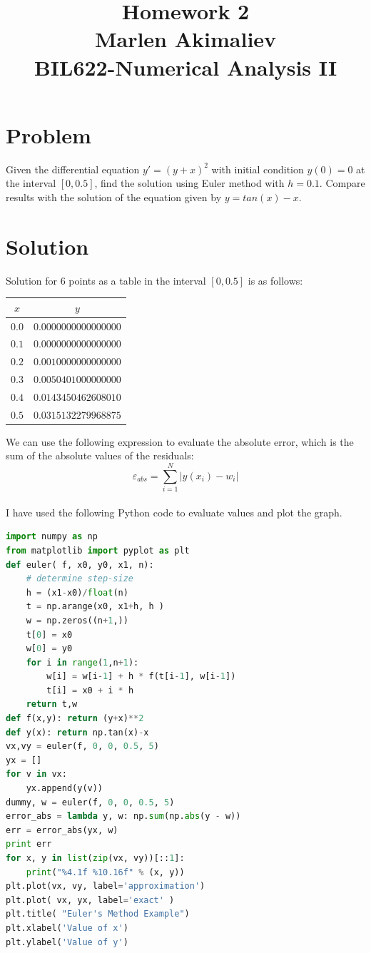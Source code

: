 \documentclass[a4paper,10pt]{article}
\date{\displaydate{date}}
\title{Homework 2\\Marlen Akimaliev\\BIL622-Numerical Analysis II}
\begin{document}
\maketitle

\section{Problem}
Given the differential equation $y'=(y+x)^2$ with initial condition $y(0)=0$ at the interval $[0, 0.5]$, find the solution using Euler method with $h=0.1$. Compare results with the solution of the equation given by $y = tan(x)-x$.
\section{Solution}
Solution for 6 points as a table in the interval $[0, 0.5]$ is as follows:
\begin{center}
\begin{tabular}{ |c|c| } 
 \hline
 $x$ & $y$\\
\hline
 $0.0$ & $0.0000000000000000$\\
 $0.1$ & $0.0000000000000000$\\
 $0.2$ & $0.0010000000000000$\\
 $0.3$ & $0.0050401000000000$\\
 $0.4$ & $0.0143450462608010$\\
 $0.5$ & $0.0315132279968875$\\
 \hline
\end{tabular}
\end{center}
We can use the following expression to evaluate the absolute error, which is the sum of the absolute values of the residuals:\\
$$\varepsilon_{abs} = \sum_{i=1}^{N} |y(x_i)-w_i|$$\\
I have used the following Python code \cite{connor} to evaluate values and plot the graph.
\begin{lstlisting}[language=Python]
import numpy as np
from matplotlib import pyplot as plt
def euler( f, x0, y0, x1, n):
	# determine step-size
	h = (x1-x0)/float(n)             
	t = np.arange(x0, x1+h, h )         
	w = np.zeros((n+1,))                     
	t[0] = x0
	w[0] = y0   
	for i in range(1,n+1):                       
		w[i] = w[i-1] + h * f(t[i-1], w[i-1])
		t[i] = x0 + i * h
	return t,w
def f(x,y): return (y+x)**2
def y(x): return np.tan(x)-x
vx,vy = euler(f, 0, 0, 0.5, 5)
yx = []
for v in vx:
	yx.append(y(v))
dummy, w = euler(f, 0, 0, 0.5, 5)
error_abs = lambda y, w: np.sum(np.abs(y - w))
err = error_abs(yx, w)
print err
for x, y in list(zip(vx, vy))[::1]:
    print("%4.1f %10.16f" % (x, y))
plt.plot(vx, vy, label='approximation')
plt.plot( vx, yx, label='exact' )
plt.title( "Euler's Method Example")
plt.xlabel('Value of x') 
plt.ylabel('Value of y')
\end{lstlisting}
\end{document}
